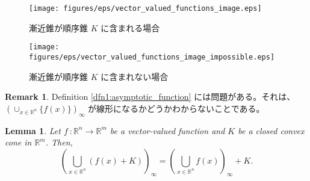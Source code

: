 \documentclass[a4paper,11pt]{jsarticle}
\newtheorem{lem}[thm]{Lemma}
\theoremstyle{definition}
\newtheorem{rem}[thm]{Remark}
\newcommand{\NDemenstionalRealEuclideanSpace}{\mathbb{R}^n}
\newcommand{\MDemenstionalRealEuclideanSpace}{\mathbb{R}^m}
\newcommand{\VectorValuedFunction}[3]{{#1}\:\colon{#2} \to {#3}}
\begin{document}
\centering
\begin{figure}[h]
  \centering
  \begin{minipage}[b]{0.49\columnwidth}
      \centering
      \texttt{[image: figures/eps/vector\_valued\_functions\_image.eps]}
      \caption{漸近錐が順序錐 $K$ に含まれる場合}
      \label{fig:a}
  \end{minipage}
  \begin{minipage}[b]{0.49\columnwidth}
      \centering
      \texttt{[image: figures/eps/vector\_valued\_functions\_image\_impossible.eps]}
      \caption{漸近錐が順序錐 $K$ に含まれない場合}
      \label{fig:b}
  \end{minipage}
\end{figure}

\begin{rem}
  Definition \ref{dfn1:asymptotic_function} には問題がある。それは、$(\cup_{x \in \NDemenstionalRealEuclideanSpace} \{f(x)\})_{\infty}$ が線形になるかどうかわからないことである。
\end{rem}

\begin{lem}
  Let $\VectorValuedFunction{f}{\NDemenstionalRealEuclideanSpace}{\MDemenstionalRealEuclideanSpace}$ be a vector-valued function 
  and $K$ be a closed convex cone in $\MDemenstionalRealEuclideanSpace$. Then, 
  \begin{equation}
    (\bigcup_{x \in \NDemenstionalRealEuclideanSpace} (f(x) + K))_{\infty} = (\bigcup_{x \in \NDemenstionalRealEuclideanSpace} f(x))_{\infty} + K.
  \end{equation}
\end{lem}
\end{document}
